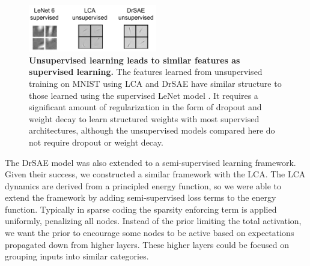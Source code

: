 \begin{figure}
    \centering
    \includegraphics[width=0.5\textwidth]{figures/lenet_lca_drsae_weights.png}
    \caption{\textbf{Unsupervised learning leads to similar features as supervised learning.} The features learned from unsupervised training on MNIST using LCA \parencite{rozell2008sparse} and DrSAE \parencite{rolfe2013discriminative} have similar structure to those learned using the supervised LeNet model \parencite{lecun1998gradient}. It requires a significant amount of regularization in the form of dropout and weight decay to learn structured weights with most supervised architectures, although the unsupervised models compared here do not require dropout or weight decay.}
    \label{fig:ch3_lenet_lca_drsae_weights}
\end{figure}

The DrSAE model was also extended to a semi-supervised learning framework. Given their success, we constructed a similar framework with the LCA. The LCA dynamics are derived from a principled energy function, so we were able to extend the framework by adding semi-supervised loss terms to the energy function. Typically in sparse coding the sparsity enforcing term is applied uniformly, penalizing all nodes. Instead of the prior limiting the total activation, we want the prior to encourage some nodes to be active based on expectations propagated down from higher layers. These higher layers could be focused on grouping inputs into similar categories.

